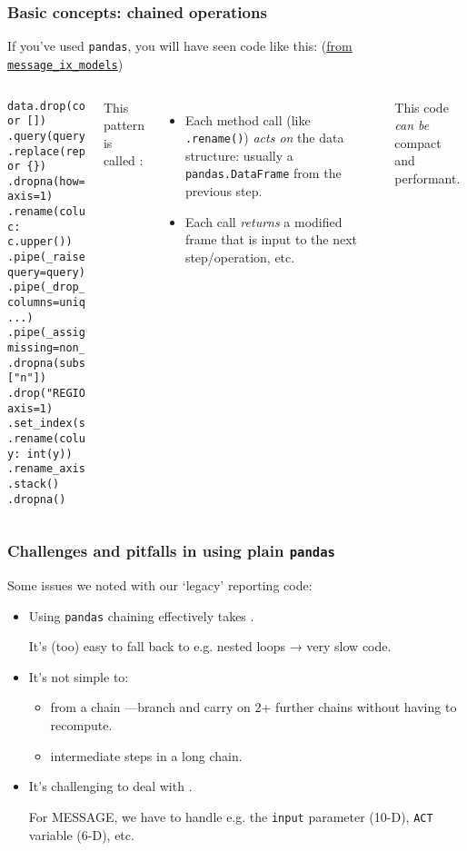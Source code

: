 \documentclass[12pt,aspectratio=169]{beamer}
\renewcommand{\mod}[1]{\texttt{#1}}
\newcommand{\py}[1]{\texttt{#1}}
\begin{document}
\begin{frame}[fragile]
\frametitle{Basic concepts: chained operations}
If you've used \mod{pandas},
you will have seen code like this:
(\href{https://github.com/iiasa/message-ix-models/blob/7a999bc0c636f0afea73f89f12e5cfe593d6d23c/message_ix_models/tools/iamc.py#L240-L254}
{from \mod{message_ix_models}})

\begin{columns}
\column{0.45\paperwidth}
\begin{verbatim}
data.drop(columns=drop or [])
.query(query)
.replace(replace or {})
.dropna(how="all", axis=1)
.rename(columns=lambda c: c.upper())
.pipe(_raise_empty, query=query)
.pipe(_drop_unique, columns=unique, ...)
.pipe(_assign_n, missing=non_iso_3166)
.dropna(subset=["n"])
.drop("REGION", axis=1)
.set_index(set_index)
.rename(columns=lambda y: int(y))
.rename_axis(columns="y")
.stack()
.dropna()
\end{verbatim}

\column{0.45\paperwidth}
\pause
This pattern is called :
\begin{itemize}
  \item Each method call (like \py{.rename()}) \emph{acts on}
    the data structure: usually a \py{pandas.DataFrame} from the previous step.
  \item Each call \emph{returns} a modified frame that is input to the next step/operation, etc.
\end{itemize}

This code \emph{can be} compact and performant.
\end{columns}
\end{frame}

\begin{frame}
\frametitle{Challenges and pitfalls in using plain \texttt{pandas}}

Some issues we noted with our ‘legacy' reporting code:

\bigskip
\begin{itemize}
  \item Using \mod{pandas} chaining effectively takes .

    It's (too) easy to fall back to e.g. nested loops → very slow code.
  \item It's not simple to:
    \begin{itemize}
      \item {} from a chain%
        —branch and carry on 2+ further chains without having to recompute.
      \item {} intermediate steps in a long chain.
    \end{itemize}
  \item It's challenging to deal with .

    For MESSAGE, we have to handle e.g. the
    \texttt{input} parameter (10-D),
    \texttt{ACT} variable (6-D), etc.
\end{itemize}
\end{frame}
\end{document}
